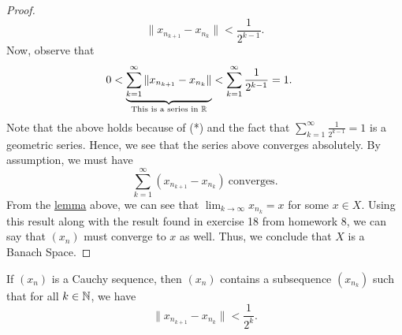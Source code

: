 \documentclass[a4paper]{article}
\begin{document}
\begin{proof}
\[  \|{x}_{{n}_{k+1}} - {x}_{{n}_{k}} \| < \frac{ 1 }{ 2^{k-1} }. \]
Now, observe that 
\begin{align*}
    0 < \underbrace{\sum_{ k=1  }^{ \infty   } \| {x}_{{n}_{k+1}} - {x}_{{n}_{k}} \|}_{\text{This is a series in \( \ensuremath{\mathbb{R}}\)}} &< \sum_{ k=1  }^{ \infty   } \frac{ 1 }{ 2^{k-1} } = 1.
\end{align*}
Note that the above holds because of (*) and the fact that \( \displaystyle \sum_{ k=1  }^{ \infty    } \frac{ 1 }{ 2^{k-1} } = 1  \) is a geometric series. Hence, we see that the series above converges absolutely. By assumption, we must have 
\[  \sum_{ k=1  }^{ \infty  } ({x}_{{n}_{k+1}} - {x}_{{n}_{k}} ) \ \text{converges}. \]
From the {\hyperref[lemma]{lemma}} above, we can see that \( \lim_{ k  \to  \infty   }  {x}_{{n}_{k}} = x \) for some \( x \in X \). Using this result along with the result found in exercise 18 from homework 8, we can say that \( ({x}_{n}) \) must converge to \( x  \) as well. Thus, we conclude that \( X  \) is a Banach Space.
\end{proof} 

If \( ({x}_{n}) \) is a Cauchy sequence, then \( ({x}_{n}) \) contains a subsequence \( ({x}_{{n}_{k}}) \) such that for all \( k \in \mathbb{N}  \), we have
\[  \| {x}_{{n}_{k+1}} - {x}_{{n}_{k}} \| < \frac{ 1 }{ 2^{k} }.  \]
\end{document}
